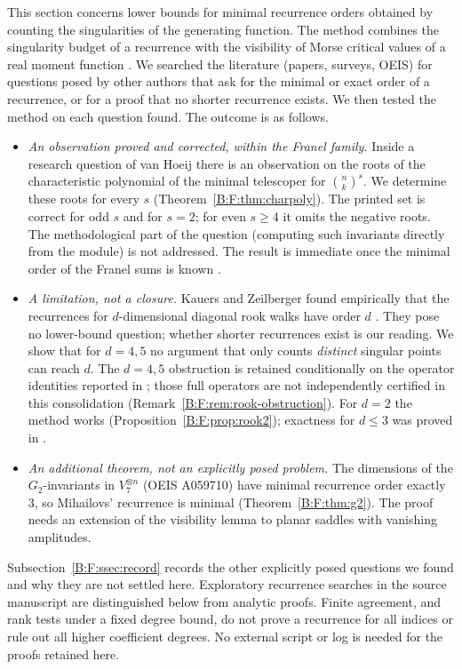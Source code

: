 \documentclass[11pt,a4paper]{article}
\theoremstyle{definition}
\theoremstyle{remark}
\numberwithin{equation}{section}
\begin{document}
This section concerns lower bounds for minimal recurrence orders obtained by
counting the singularities of the generating function. The method combines
the singularity budget of a recurrence with the visibility of Morse critical
values of a real moment function \cite{R021,R019}. We searched the
literature (papers, surveys, OEIS) for questions posed by other authors that
ask for the minimal or exact order of a recurrence, or for a proof that no
shorter recurrence exists. We then tested the method on each question found.
The outcome is as follows.
\begin{itemize}
\item[(F1)] \emph{An observation proved and corrected, within the Franel
family.} Inside a research question of van Hoeij \cite[\S7, Question~1]{R055}
there is an observation on the roots of the characteristic polynomial of the
minimal telescoper for $\binom nk^s$. We determine these roots for every $s$
(Theorem~\ref{B:F:thm:charpoly}). The printed set is correct for odd $s$ and for
$s=2$; for even $s\ge4$ it omits the negative roots. The methodological part of
the question (computing such invariants directly from the module) is not
addressed. The result is immediate once the minimal order of the Franel sums is
known \cite{R019}.
\item[(F2)] \emph{A limitation, not a closure.} Kauers and Zeilberger found
empirically that the recurrences for $d$-dimensional diagonal rook walks have
order $d$ \cite{R056}. They pose no lower-bound question; whether shorter
recurrences exist is our reading. We show that for $d=4,5$ no argument that
only counts \emph{distinct} singular points can reach $d$. The $d=4,5$ obstruction is retained conditionally on the operator identities reported in \cite[Prop.~2.12]{R022}; those full operators are not independently certified in this consolidation (Remark~\ref{B:F:rem:rook-obstruction}).
For $d=2$ the method works (Proposition~\ref{B:F:prop:rook2}); exactness for
$d\le3$ was proved in \cite{R022}.
\item[(F3)] \emph{An additional theorem, not an explicitly posed problem.}
The dimensions of the $G_2$-invariants in $V_7^{\otimes n}$ (OEIS A059710)
have minimal recurrence order exactly~$3$, so Mihailovs' recurrence is
minimal (Theorem~\ref{B:F:thm:g2}). The proof needs an extension of the
visibility lemma to planar saddles with vanishing amplitudes.
\end{itemize}
Subsection~\ref{B:F:ssec:record} records the other explicitly posed questions
we found and why they are not settled here. Exploratory recurrence searches in the source manuscript are distinguished below from analytic proofs. Finite agreement, and rank tests under a fixed degree bound, do not prove a recurrence for all indices or rule out all higher coefficient degrees. No external script or log is needed for the proofs retained here.
\end{document}
